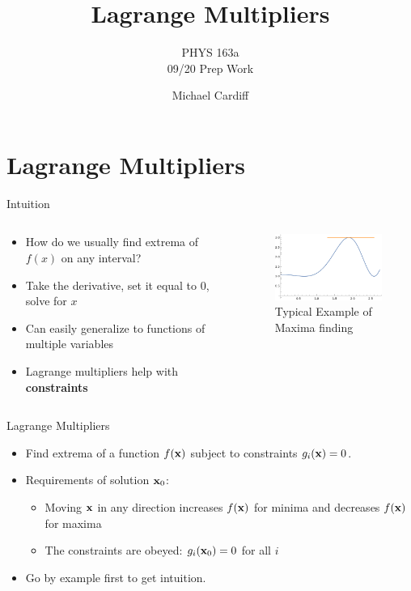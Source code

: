 \documentclass{beamer}
\title{Lagrange Multipliers}
\author{Michael Cardiff}
\subtitle{PHYS 163a \\ 09/20 Prep Work}
\begin{document}
\begin{frame}
  \titlepage
\end{frame}
\section{Lagrange Multipliers}
\begin{frame}{Intuition}
  \begin{columns}
    \begin{column}{0.4\textwidth}
      \begin{itemize}
      \item How do we usually find extrema of $f(x)$ on any interval?
      \item Take the derivative, set it equal to $0$, solve for $x$
      \item Can easily generalize to functions of multiple variables
      \item Lagrange multipliers help with \textbf{constraints}
      \end{itemize}
    \end{column}
    \begin{column}{0.6\textwidth}
      \begin{figure}[H]
        \centering
        \includegraphics[width=5.0cm]{minmax.png}
        \caption{Typical Example of Maxima finding}
      \end{figure}
    \end{column}
  \end{columns}
\end{frame}
\begin{frame}{Lagrange Multipliers}
  \begin{itemize}
  \item Find extrema of a function $f(\vb{x})$ subject to constraints $g_i(\vb{x})=0$.
  \item Requirements of solution $\vb{x}_0$:
    \begin{itemize}
    \item Moving $\vb{x}$ in any direction increases $f(\vb{x})$ for minima and decreases $f(\vb{x})$ for maxima
    \item The constraints are obeyed: $g_i(\vb{x}_0)=0$ for all $i$
    \end{itemize}
  \item Go by example first to get intuition.
  \end{itemize}
\end{frame}
\end{document}
